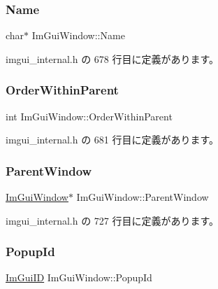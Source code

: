 \subsubsection{\texorpdfstring{Name}{Name}}
{\footnotesize\ttfamily char$\ast$ Im\+Gui\+Window\+::\+Name}



 imgui\+\_\+internal.\+h の 678 行目に定義があります。

\mbox{\label{struct_im_gui_window_a81cb24c35445e1259367284701253c79}} 
\subsubsection{\texorpdfstring{Order\+Within\+Parent}{OrderWithinParent}}
{\footnotesize\ttfamily int Im\+Gui\+Window\+::\+Order\+Within\+Parent}



 imgui\+\_\+internal.\+h の 681 行目に定義があります。

\mbox{\label{struct_im_gui_window_a5f0b37cb12fbeb3efe00d0cd826d5d65}} 
\subsubsection{\texorpdfstring{Parent\+Window}{ParentWindow}}
{\footnotesize\ttfamily \mbox{\hyperlink{struct_im_gui_window}{Im\+Gui\+Window}}$\ast$ Im\+Gui\+Window\+::\+Parent\+Window}



 imgui\+\_\+internal.\+h の 727 行目に定義があります。

\mbox{\label{struct_im_gui_window_a319c5f43fa4ee9c76b8a6e551e0c0869}} 
\subsubsection{\texorpdfstring{Popup\+Id}{PopupId}}
{\footnotesize\ttfamily \mbox{\hyperlink{imgui_8h_a1785c9b6f4e16406764a85f32582236f}{Im\+Gui\+ID}} Im\+Gui\+Window\+::\+Popup\+Id}



